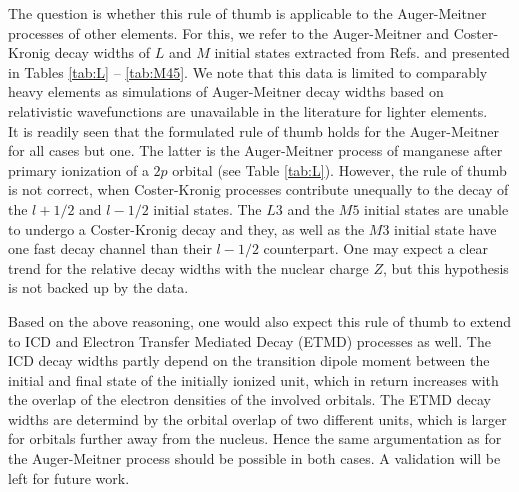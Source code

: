 {

The question is whether this rule of thumb is applicable to the Auger-Meitner
processes of other elements. For this, we refer to the Auger-Meitner and
Coster-Kronig decay widths of $L$ and $M$ initial states extracted from Refs.
\cite{Chen81,Chen83,Chen80} and presented in Tables \ref{tab:L} -- \ref{tab:M45}.
We note that this data is limited to comparably heavy elements as simulations
of Auger-Meitner decay widths based on relativistic wavefunctions are unavailable
in the literature for lighter elements.\\

It is readily seen that the formulated rule of thumb holds for the Auger-Meitner
for all cases but one. The latter is the Auger-Meitner process of manganese after
primary ionization of a $2p$ orbital (see Table \ref{tab:L}).
However, the rule of thumb is not correct, when Coster-Kronig processes contribute
unequally to the decay of the $l+1/2$ and $l-1/2$ initial states.
The $L3$ and the $M5$ initial states are unable to undergo a Coster-Kronig decay
and they, as well as the $M3$ initial state have one fast decay channel than their
$l-1/2$ counterpart.
One may expect a clear trend for the relative decay widths with the nuclear charge
$Z$, but this hypothesis is not backed up by the data.

}

{Based on the above reasoning, one would also expect}
this rule of thumb to extend to ICD and
Electron Transfer Mediated Decay (ETMD) processes as well. The ICD
decay widths partly depend on the transition dipole moment between the
initial and final state of the initially ionized unit, which in return increases
with the overlap of the electron densities of the involved orbitals.
The ETMD decay widths are determind by the orbital overlap of two different units,
which is larger for orbitals further away from the nucleus.
Hence the same argumentation as for the Auger-Meitner process
{should be possible}
in both cases.
{A validation will be left for future work.}



